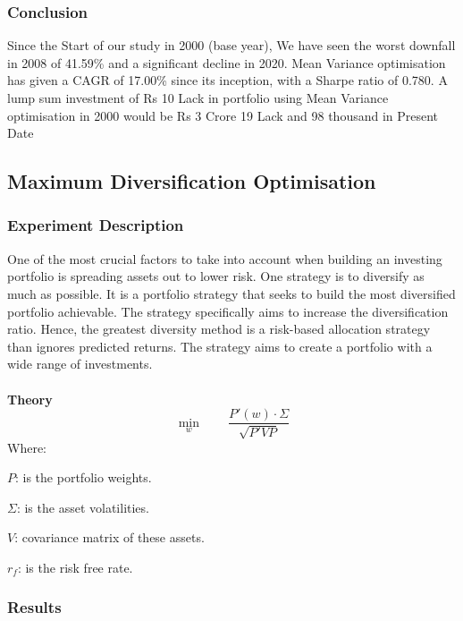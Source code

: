 \subsubsection{Conclusion}
Since the Start of our study in 2000 (base year), We have seen the worst downfall in 2008 of 41.59\% and a significant decline in 2020. Mean Variance optimisation has given a CAGR of 17.00\% since its inception, with a Sharpe ratio of 0.780. A lump sum investment of Rs 10 Lack in portfolio using Mean Variance optimisation in 2000 would be Rs 3 Crore 19 Lack and 98 thousand in Present Date
\subsection{Maximum Diversification Optimisation}
\subsubsection{Experiment Description}

One of the most crucial factors to take into account when building an investing portfolio is spreading assets out to lower risk. One strategy is to diversify as much as possible. It is a portfolio strategy that seeks to build the most diversified portfolio achievable. The strategy specifically aims to increase the diversification ratio. Hence, the greatest diversity method is a risk-based allocation strategy than ignores predicted returns. The strategy aims to create a portfolio with a wide range of investments.\\\\
\textbf{Theory}\\

\[\underset{w}{\min}\qquad \frac{P' (w) \cdot \Sigma}{\sqrt{P'VP}}\]
Where:

$P$: is the portfolio weights.

$\Sigma$: is the asset volatilities.

$V$: covariance matrix of these assets.

$r_{f}$: is the risk free rate.\\

\subsubsection{Results}

